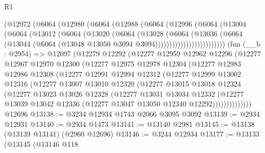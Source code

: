 \begin{lexlean}{R1}
\begin{coremodule}
            (@12972
              (@6064
                (@12980
                  (@6064
                    (@12988
                      (@6064
                        (@12996
                          (@6064
                            (@13004
                              (@6064
                                (@13012
                                  (@6064
                                    (@13020
                                      (@6064
                                        (@13028
                                          (@6064
                                            (@13036
                                              (@6064
                                                (@13044
                                                  (@6064
                                                    (@13048
                                                      @13050
                                                      @3094
                                                      @3094)))))))))))))))))))))))))
    (fun (__b : @2954) =>
    @12097
      (@12279
        @12292
        (@12277
          @12959
          @12962
          @12296
          (@12277
            @12967
            @12970
            @12300
            (@12277
              @12975
              @12978
              @12304
              (@12277
                @12983
                @12986
                @12308
                (@12277
                  @12991
                  @12994
                  @12312
                  (@12277
                    @12999
                    @13002
                    @12316
                    (@12277
                      @13007
                      @13010
                      @12320
                      (@12277
                        @13015
                        @13018
                        @12324
                        (@12277
                          @13023
                          @13026
                          @12328
                          (@12277
                            @13031
                            @13034
                            @12332
                            (@12277
                              @13039
                              @13042
                              @12336
                              (@12277 @13047 @13050 @12340 @12292))))))))))))))
    @12696
@13138 := @3234 @12934 @1743 @2066 @3095 @3092
@13139 := @2934 @12931
@13140 := @2934 @1473
@13141 := @13140 @2981
@13145 := @13138 (@13139 @13141) (@2960 @12696)
@13146 := @3244 @12934
@13177 := @13133
    (@13145
      (@13146
        @118

\end{coremodule}
\end{lexlean}
